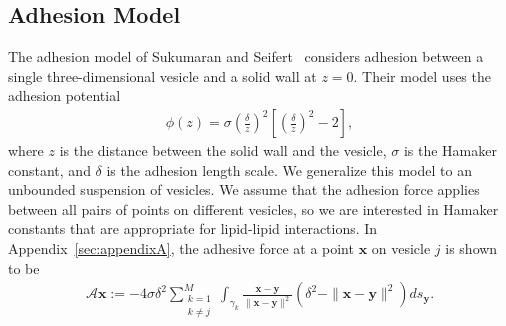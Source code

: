 \documentclass[aps,prl,twocolumn,showpacs,amsmath,amssymb]{revtex4-1}
\renewcommand{\AA}{\mathcal{A}}
\newcommand{\xx}{\mathbf{x}}
\newcommand{\yy}{\mathbf{y}}
\begin{document}
\subsection{Adhesion Model}
The adhesion model of Sukumaran and Seifert~\cite{suk-sei2001} considers adhesion
between a single three-dimensional vesicle and a solid wall at $z=0$.
Their model uses the adhesion potential
\begin{align*}
  \phi(z) = \sigma\left(\frac{\delta}{z}\right)^2 \left[ 
    \left(\frac{\delta}{z}\right)^2 - 2 \right],
\end{align*}
where $z$ is the distance between the solid wall and the vesicle,
$\sigma$ is the Hamaker constant, and $\delta$ is the adhesion length
scale.  We generalize this model to an unbounded suspension of vesicles.
We assume that the adhesion force applies between all pairs of points on
different vesicles, so we are interested in Hamaker constants that are
appropriate for lipid-lipid interactions. In
Appendix~\ref{sec:appendixA}, the adhesive force at a point $\xx$ on
vesicle $j$ is shown to be
\begin{align}
  \AA\xx:=-4 \sigma \delta^2\sum_{\substack{k=1 \\ k \neq j}}^M 
  \int_{\gamma_k} \frac{\xx - \yy}{\|\xx - \yy\|^2} 
  \left(\delta^2 - \|\xx - \yy\|^2 \right) ds_\yy.
  \label{eqn:adhesionForce}
\end{align}




\end{document}
